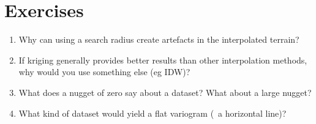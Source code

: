 %
\section{Exercises}

\begin{enumerate}
\item Why can using a search radius create artefacts in the interpolated terrain?
\item If kriging generally provides better results than other interpolation methods, why would you use something else (eg IDW)?
\item What does a nugget of zero say about a dataset? What about a large nugget?
\item What kind of dataset would yield a flat variogram (\ie\ a horizontal line)?
\end{enumerate}